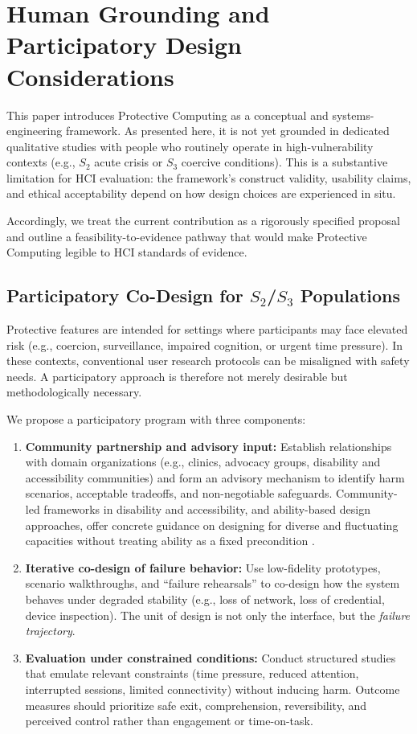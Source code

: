 \documentclass[12pt]{article}
\begin{document}
\section{Human Grounding and Participatory Design Considerations}

This paper introduces Protective Computing as a conceptual and systems-engineering framework. As presented here, it is not yet grounded in dedicated qualitative studies with people who routinely operate in high-vulnerability contexts (e.g., $S_2$ acute crisis or $S_3$ coercive conditions). This is a substantive limitation for HCI evaluation: the framework's construct validity, usability claims, and ethical acceptability depend on how design choices are experienced in situ.

Accordingly, we treat the current contribution as a rigorously specified proposal and outline a feasibility-to-evidence pathway that would make Protective Computing legible to HCI standards of evidence.

\subsection{Participatory Co-Design for $S_2$/$S_3$ Populations}
Protective features are intended for settings where participants may face elevated risk (e.g., coercion, surveillance, impaired cognition, or urgent time pressure). In these contexts, conventional user research protocols can be misaligned with safety needs. A participatory approach is therefore not merely desirable but methodologically necessary.

We propose a participatory program with three components:
\begin{enumerate}
\item \textbf{Community partnership and advisory input:} Establish relationships with domain organizations (e.g., clinics, advocacy groups, disability and accessibility communities) and form an advisory mechanism to identify harm scenarios, acceptable tradeoffs, and non-negotiable safeguards. Community-led frameworks in disability and accessibility, and ability-based design approaches, offer concrete guidance on designing for diverse and fluctuating capacities without treating ability as a fixed precondition \cite{charlton1998nothingaboutus,wobbrock2011abilitybased,costanzaChock2020designJustice}.
\item \textbf{Iterative co-design of failure behavior:} Use low-fidelity prototypes, scenario walkthroughs, and ``failure rehearsals'' to co-design how the system behaves under degraded stability (e.g., loss of network, loss of credential, device inspection). The unit of design is not only the interface, but the \emph{failure trajectory}.
\item \textbf{Evaluation under constrained conditions:} Conduct structured studies that emulate relevant constraints (time pressure, reduced attention, interrupted sessions, limited connectivity) without inducing harm. Outcome measures should prioritize safe exit, comprehension, reversibility, and perceived control rather than engagement or time-on-task.
\end{enumerate}
\end{document}
